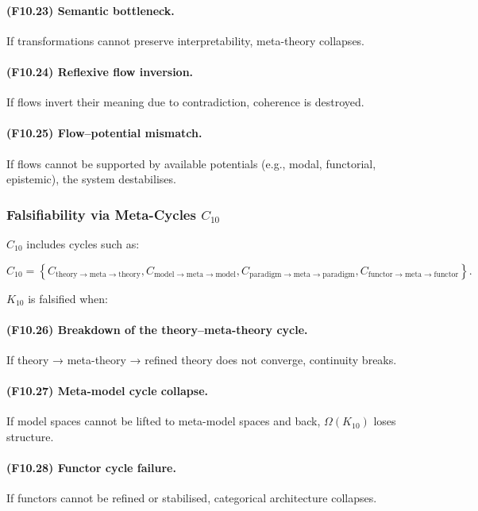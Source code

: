 \paragraph{(F10.23) Semantic bottleneck.}
If transformations cannot preserve interpretability,
meta-theory collapses.

\paragraph{(F10.24) Reflexive flow inversion.}
If flows invert their meaning due to contradiction,
coherence is destroyed.

\paragraph{(F10.25) Flow–potential mismatch.}
If flows cannot be supported by available potentials
(e.g., modal, functorial, epistemic),
the system destabilises.



\subsubsection{Falsifiability via Meta-Cycles $C_{10}$}

$C_{10}$ includes cycles such as:

\[
C_{10} = 
\left\{
C_{\mathrm{theory\to meta\to theory}},
C_{\mathrm{model\to meta\to model}},
C_{\mathrm{paradigm\to meta\to paradigm}},
C_{\mathrm{functor\to meta\to functor}}
\right\}.
\]

$K_{10}$ is falsified when:

\paragraph{(F10.26) Breakdown of the theory–meta-theory cycle.}
If theory → meta-theory → refined theory does not converge,
continuity breaks.

\paragraph{(F10.27) Meta-model cycle collapse.}
If model spaces cannot be lifted to meta-model spaces and back,
$\Omega(K_{10})$ loses structure.

\paragraph{(F10.28) Functor cycle failure.}
If functors cannot be refined or stabilised,
categorical architecture collapses.

